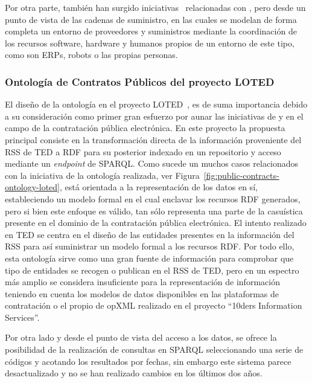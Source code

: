 Por otra parte, también han surgido iniciativas~\cite{DBLP:journals/tcci/Alor-HernandezAJPRMBG10} relacionadas con \eproc, pero desde un punto de vista
de las cadenas de suministro, en las cuales se modelan de forma completa un entorno de proveedores y suministros mediante la coordinación
de los recursos software, hardware y humanos propios de un entorno de este tipo, como son \gls{ERP}s, robots o las propias personas. 

\subsubsection{Ontología de Contratos Públicos del proyecto LOTED}
El diseño de la ontología en el proyecto LOTED~\cite{loted-project}, es de suma importancia debido a su consideración 
como primer gran esfuerzo por aunar las iniciativas de \linkeddata y \opendata en el campo de la contratación 
pública electrónica. En este proyecto la propuesta principal consiste en la transformación directa 
de la información proveniente del \gls{RSS} de \gls{TED} a \gls{RDF} para su posterior indexado en un repositorio y acceso 
mediante un \textit{endpoint} de \gls{SPARQL}. Como sucede un muchos casos relacionados con la iniciativa 
de \linkeddata la ontología realizada, ver Figura~\ref{fig:public-contracts-ontology-loted}, está orientada a la representación de los datos en sí, estableciendo 
un modelo formal en el cual enclavar los recursos RDF generados, pero si bien este enfoque es válido, tan sólo 
representa una parte de la casuística presente en el dominio de la contratación pública electrónica. El intento 
realizado en TED se centra en el diseño de las entidades presentes en la información del RSS para así suministrar 
un modelo formal a los recursos RDF. Por todo ello, esta ontología sirve como una gran fuente de información 
para comprobar que tipo de entidades se recogen o publican en el RSS de TED, pero en un espectro más amplio 
se considera insuficiente para la representación de información teniendo en cuenta los modelos de datos 
disponibles en las plataformas de contratación o el propio de \gls{opXML} realizado en el proyecto ``10ders Information Services''.


Por otra lado y desde el punto de vista del acceso a los datos, se ofrece la posibilidad de la realización 
de consultas en SPARQL seleccionando una serie de códigos y acotando los resultados por fechas, sin embargo este sistema 
parece desactualizado y no se han realizado cambios en los últimos dos años. 

